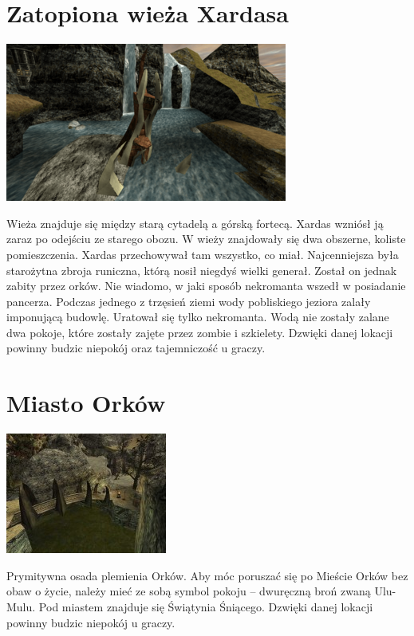 \documentclass[11pt,polish, openany]{book}
\begin{document}
\section{Zatopiona wieża Xardasa}
\begin{center}
 \includegraphics[scale=1.0]{zatopionawiezaxardasa.png}
\end{center}
Wieża znajduje się między starą cytadelą a górską fortecą. Xardas wzniósł ją zaraz po odejściu ze starego obozu. W wieży znajdowały się dwa obszerne, koliste pomieszczenia. Xardas przechowywał tam wszystko, co miał. Najcenniejsza była starożytna zbroja runiczna, którą nosił niegdyś wielki generał. Został on jednak zabity przez orków. Nie wiadomo, w jaki sposób nekromanta wszedł w posiadanie pancerza. Podczas jednego z trzęsień ziemi wody pobliskiego jeziora zalały imponującą budowlę. Uratował się tylko nekromanta. Wodą nie zostały zalane dwa pokoje, które zostały zajęte przez zombie i szkielety.
Dzwięki danej lokacji powinny budzic niepokój oraz tajemniczość u graczy.
\section{Miasto Orków}
\begin{center}
	\includegraphics[scale=1.8]{miastoorkow.jpg}
\end{center}
Prymitywna osada plemienia Orków. Aby móc poruszać się po Mieście Orków bez obaw o życie, należy mieć ze sobą symbol pokoju – dwuręczną broń zwaną Ulu-Mulu. Pod miastem znajduje się Świątynia Śniącego.
Dzwięki danej lokacji powinny budzic niepokój u graczy.
\end{document}
